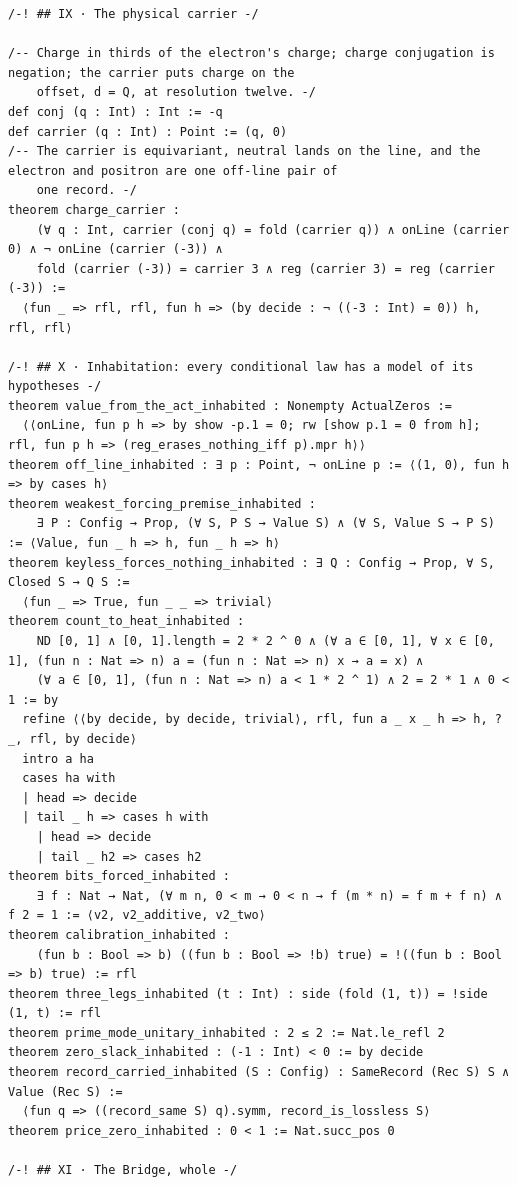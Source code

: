 \documentclass[10pt,twocolumn]{article}
\begin{document}
\begin{Verbatim}
/-! ## IX · The physical carrier -/

/-- Charge in thirds of the electron's charge; charge conjugation is negation; the carrier puts charge on the
    offset, d = Q, at resolution twelve. -/
def conj (q : Int) : Int := -q
def carrier (q : Int) : Point := (q, 0)
/-- The carrier is equivariant, neutral lands on the line, and the electron and positron are one off-line pair of
    one record. -/
theorem charge_carrier :
    (∀ q : Int, carrier (conj q) = fold (carrier q)) ∧ onLine (carrier 0) ∧ ¬ onLine (carrier (-3)) ∧
    fold (carrier (-3)) = carrier 3 ∧ reg (carrier 3) = reg (carrier (-3)) :=
  ⟨fun _ => rfl, rfl, fun h => (by decide : ¬ ((-3 : Int) = 0)) h, rfl, rfl⟩

/-! ## X · Inhabitation: every conditional law has a model of its hypotheses -/
theorem value_from_the_act_inhabited : Nonempty ActualZeros :=
  ⟨⟨onLine, fun p h => by show -p.1 = 0; rw [show p.1 = 0 from h]; rfl, fun p h => (reg_erases_nothing_iff p).mpr h⟩⟩
theorem off_line_inhabited : ∃ p : Point, ¬ onLine p := ⟨(1, 0), fun h => by cases h⟩
theorem weakest_forcing_premise_inhabited :
    ∃ P : Config → Prop, (∀ S, P S → Value S) ∧ (∀ S, Value S → P S) := ⟨Value, fun _ h => h, fun _ h => h⟩
theorem keyless_forces_nothing_inhabited : ∃ Q : Config → Prop, ∀ S, Closed S → Q S :=
  ⟨fun _ => True, fun _ _ => trivial⟩
theorem count_to_heat_inhabited :
    ND [0, 1] ∧ [0, 1].length = 2 * 2 ^ 0 ∧ (∀ a ∈ [0, 1], ∀ x ∈ [0, 1], (fun n : Nat => n) a = (fun n : Nat => n) x → a = x) ∧
    (∀ a ∈ [0, 1], (fun n : Nat => n) a < 1 * 2 ^ 1) ∧ 2 = 2 * 1 ∧ 0 < 1 := by
  refine ⟨⟨by decide, by decide, trivial⟩, rfl, fun a _ x _ h => h, ?_, rfl, by decide⟩
  intro a ha
  cases ha with
  | head => decide
  | tail _ h => cases h with
    | head => decide
    | tail _ h2 => cases h2
theorem bits_forced_inhabited :
    ∃ f : Nat → Nat, (∀ m n, 0 < m → 0 < n → f (m * n) = f m + f n) ∧ f 2 = 1 := ⟨v2, v2_additive, v2_two⟩
theorem calibration_inhabited :
    (fun b : Bool => b) ((fun b : Bool => !b) true) = !((fun b : Bool => b) true) := rfl
theorem three_legs_inhabited (t : Int) : side (fold (1, t)) = !side (1, t) := rfl
theorem prime_mode_unitary_inhabited : 2 ≤ 2 := Nat.le_refl 2
theorem zero_slack_inhabited : (-1 : Int) < 0 := by decide
theorem record_carried_inhabited (S : Config) : SameRecord (Rec S) S ∧ Value (Rec S) :=
  ⟨fun q => ((record_same S) q).symm, record_is_lossless S⟩
theorem price_zero_inhabited : 0 < 1 := Nat.succ_pos 0

/-! ## XI · The Bridge, whole -/


\end{Verbatim}
\end{document}
